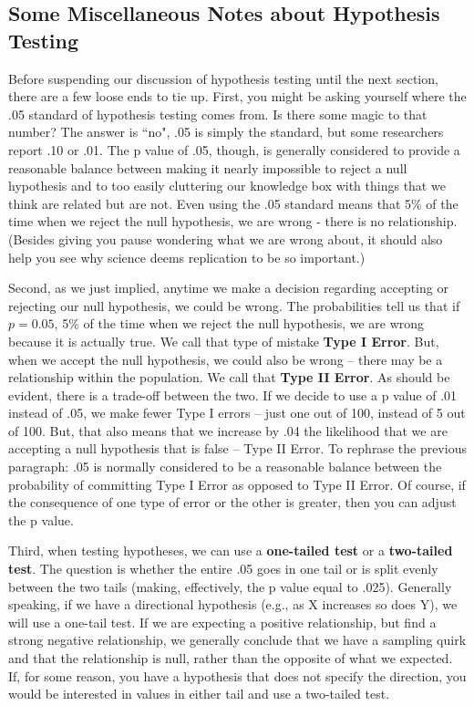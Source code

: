 \documentclass[11pt,openany]{book}\usepackage[]{graphicx}\usepackage[]{color}
\begin{document}
{\subsection{Some Miscellaneous Notes about Hypothesis Testing}
Before suspending our discussion of hypothesis testing until the next section, there are a few loose ends to tie up.  First, you might be asking yourself where the .05 standard of hypothesis testing comes from.  Is there some magic to that number?  The answer is ``no", .05 is simply the standard, but some researchers report .10 or .01.  The p value of .05, though, is generally considered to provide a reasonable balance between making it nearly impossible to reject a null hypothesis and to too easily cluttering our knowledge box with things that we think are related but are not.  Even using the .05 standard means that 5\% of the time when we reject the null hypothesis, we are wrong - there is no relationship.  (Besides giving you pause wondering what we are wrong about, it should also help you see why science deems replication to be so important.)

Second, as we just implied, anytime we make a decision regarding accepting or rejecting our null hypothesis, we could be wrong.  The probabilities tell us that if $p = 0.05$, 5\% of the time when we reject the null hypothesis, we are wrong because it is actually true.  We call that type of mistake \textbf{Type I Error}.  But, when we accept the null hypothesis, we could also be wrong -- there may be a relationship within the population.  We call that \textbf{Type II Error}.  As should be evident, there is a trade-off between the two.  If we decide to use a p value of .01 instead of .05, we make fewer Type I errors -- just one out of 100, instead of 5 out of 100.  But, that also means that we increase by .04 the likelihood that we are accepting a null hypothesis that is false -- Type II Error.  To rephrase the previous paragraph: .05 is normally considered to be a reasonable balance between the probability of committing Type I Error as opposed to Type II Error.  Of course, if the consequence of one type of error or the other is greater, then you can adjust the p value.
  
Third, when testing hypotheses, we can use a \textbf{one-tailed test} or a \textbf{two-tailed test}.  The question is whether the entire .05 goes in one tail or is split evenly between the two tails (making, effectively, the p value equal to .025).  Generally speaking, if we have a directional hypothesis  (e.g., as X increases so does Y), we will use a one-tail test.  If we are expecting a positive relationship, but find a strong negative relationship, we generally conclude that we have a sampling quirk and that the relationship is null, rather than the opposite of what we expected.  If, for some reason, you have a hypothesis that does not specify the direction, you would be interested in values in either tail and use a two-tailed test.

}
\end{document}
